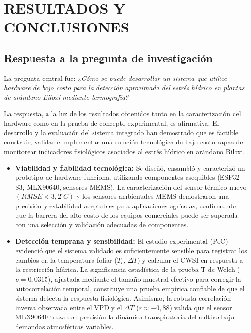 
\chapter{RESULTADOS Y CONCLUSIONES}
\label{chap:conclusiones}

\section{Respuesta a la pregunta de investigación}
\label{sec:respuesta_pregunta}

La pregunta central fue: \textit{¿Cómo se puede desarrollar un sistema que utilice hardware de bajo costo para la detección aproximada del estrés hídrico en plantas de arándano Biloxi mediante termografía?}

La respuesta, a la luz de los resultados obtenidos tanto en la caracterización del hardware como en la prueba de concepto experimental, es afirmativa. El desarrollo y la evaluación del sistema integrado han demostrado que es factible construir, validar e implementar una solución tecnológica de bajo costo capaz de monitorear indicadores fisiológicos asociados al estrés hídrico en arándano Biloxi.

\begin{itemize}
    \item \textbf{Viabilidad y fiabilidad tecnológica:} Se diseñó, ensambló y caracterizó un prototipo de hardware funcional utilizando componentes asequibles (ESP32-S3, MLX90640, sensores MEMS). La caracterización del sensor térmico nuevo $(RMSE < 3,2^{\circ}C)$ y los sensores ambientales MEMS demostraron una precisión y estabilidad aceptables para aplicaciones agrícolas, confirmando que la barrera del alto costo de los equipos comerciales puede ser superada con una selección y validación adecuadas de componentes.
    \item \textbf{Detección temprana y sensibilidad:} El estudio experimental (PoC) evidenció que el sistema validado es suficientemente sensible para registrar los cambios en la temperatura foliar ($T_c$, $\Delta T$) y calcular el CWSI en respuesta a la restricción hídrica. La significancia estadística de la prueba T de Welch ($p = 0,0315$), ajustada mediante el tamaño muestral efectivo para corregir la autocorrelación temporal, constituye una prueba empírica confiable de que el sistema detecta la respuesta fisiológica. Asimismo, la robusta correlación inversa observada entre el VPD y el $\Delta T$ ($r \approx -0,88$) valida que el sensor MLX90640 traza con precisión la dinámica transpiratoria del cultivo bajo demandas atmosféricas variables.
\end{itemize}


